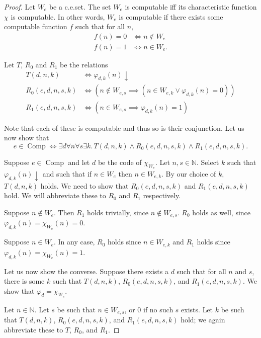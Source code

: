 \documentclass{article}
\newcommand{\terminates}{\!\!\downarrow}
\DeclareMathOperator{\Comp}{Comp}
\begin{document}
  \begin{proof}
    Let $W_e$ be a c.e.\@ set.  The set $W_e$ is computable iff its characteristic function $\chi$ is computable.  In
    other words, $W_e$ is computable if there exists some computable function $f$ such that for all $n$,
    \begin{align*}
      f(n) = 0 &\iff n \not \in W_e\\
      f(n) = 1 &\iff n \in W_e.
    \end{align*}

    Let $T$, $R_0$ and $R_1$ be the relations
    \begin{align*}
      T(d, n, k) &\iff \varphi_{d, k}(n)\terminates\\
      R_0(e, d, n, s, k) &\iff (n \not \in W_{e, s} \implies (n \in W_{e, k} \vee \varphi_{d, k}(n) = 0))\\
      R_1(e, d, n, s, k) &\iff (n \in W_{e, s} \implies \varphi_{d, k}(n) = 1)
    \end{align*}

    Note that each of these is computable and thus so is their conjunction.  Let us now show that
    \[
      e \in \Comp \iff \exists d\forall n\forall s\exists k.\, T(d, n, k) \wedge R_0(e, d, n, s, k) \wedge
        R_1(e, d, n, s, k).
    \]

    Suppose $e \in \Comp$ and let $d$ be the code of $\chi_{W_e}$.  Let $n, s \in \mathbb{N}$.  Select $k$ such that
    $\varphi_{d, k}(n)\terminates$ and such that if $n \in W_e$ then $n \in W_{e, k}$.  By our choice of $k$, $T(d, n, k)$
    holds.  We need to show that $R_0(e, d, n, s, k)$ and $R_1(e, d, n, s, k)$ hold.  We will abbreviate these to $R_0$
    and $R_1$ respectively.

    Suppose $n \not \in W_e$.  Then $R_1$ holds trivially, since $n \not \in W_{e, s}$.  $R_0$ holds as well, since
    $\varphi_{d, k}(n) = \chi_{W_e}(n) = 0$.

    Suppose $n \in W_e$.  In any case, $R_0$ holds since $n \in W_{e, k}$ and $R_1$ holds since $\varphi_{d, k}(n) =
    \chi_{W_e}(n) = 1$.

    Let us now show the converse.  Suppose there exists a $d$ such that for all $n$ and $s$, there is some $k$ such that
    $T(d, n, k)$, $R_0(e, d, n, s, k)$, and $R_1(e, d, n, s, k)$.  We show that $\varphi_d = \chi_{W_e}$.

    Let $n \in \mathbb{N}$.  Let $s$ be such that $n \in W_{e, s}$, or $0$ if no such $s$ exists.  Let $k$ be such that
    $T(d, n, k)$, $R_0(e, d, n, s, k)$, and $R_1(e, d, n, s, k)$ hold; we again abbreviate these to $T$, $R_0$, and
    $R_1$.


\end{proof}
\end{document}
